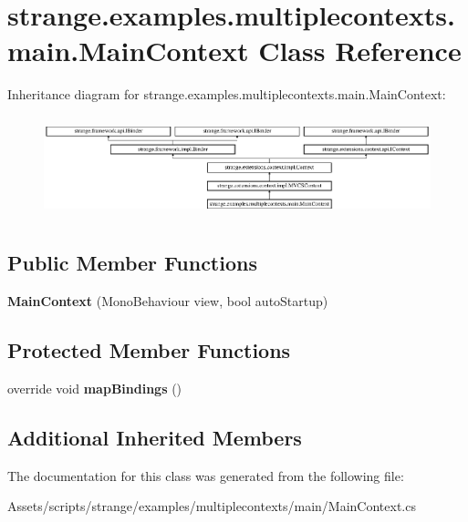 \hypertarget{classstrange_1_1examples_1_1multiplecontexts_1_1main_1_1_main_context}{\section{strange.\-examples.\-multiplecontexts.\-main.\-Main\-Context Class Reference}
\label{classstrange_1_1examples_1_1multiplecontexts_1_1main_1_1_main_context}
}
Inheritance diagram for strange.\-examples.\-multiplecontexts.\-main.\-Main\-Context\-:\begin{figure}[H]
\begin{center}
\leavevmode
\includegraphics[height=2.972399cm]{classstrange_1_1examples_1_1multiplecontexts_1_1main_1_1_main_context}
\end{center}
\end{figure}
\subsection*{Public Member Functions}
\begin{DoxyCompactItemize}
\item 
\hypertarget{classstrange_1_1examples_1_1multiplecontexts_1_1main_1_1_main_context_af61cb7b1a455c257a0a8e4f9680edddf}{{\bfseries Main\-Context} (Mono\-Behaviour view, bool auto\-Startup)}\label{classstrange_1_1examples_1_1multiplecontexts_1_1main_1_1_main_context_af61cb7b1a455c257a0a8e4f9680edddf}

\end{DoxyCompactItemize}
\subsection*{Protected Member Functions}
\begin{DoxyCompactItemize}
\item 
\hypertarget{classstrange_1_1examples_1_1multiplecontexts_1_1main_1_1_main_context_a4af1c113e0abdb69419dfcb08f980367}{override void {\bfseries map\-Bindings} ()}\label{classstrange_1_1examples_1_1multiplecontexts_1_1main_1_1_main_context_a4af1c113e0abdb69419dfcb08f980367}

\end{DoxyCompactItemize}
\subsection*{Additional Inherited Members}


The documentation for this class was generated from the following file\-:\begin{DoxyCompactItemize}
\item 
Assets/scripts/strange/examples/multiplecontexts/main/Main\-Context.\-cs\end{DoxyCompactItemize}
